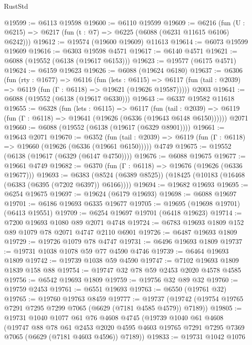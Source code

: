 \begin{lexlean}{RustStd}
\begin{coremodule}
@19599 := @6113 @19598
@19600 := @6110 @19599
@19609 := @6216
    (fun (U : @6215) => @6217 (fun (t : @7) => @6225 (@6088 (@6231 @11615 @6106) @6242)))
@19612 := @19574 (@19600 @19609) @11613
@19614 := @6073 @19599 @19609
@19616 := @6303 @19598 @4571
@19617 := @6140 @4571
@19621 := @6088 (@19552 (@6138 (@19617 @6153)))
@19623 := @19577 (@6175 @4571)
@19624 := @6159 @19623
@19626 := @6088 (@19624 @6180)
@19637 := @6306
    (fun (rty : @1677) =>
    @6116
      (fun (lets : @6115) =>
      @6117 (fun (tail : @2039) => @6119 (fun (Γ : @6118) => @19621 (@19626 @19587)))))
    @2003
@19641 := @6088 (@19552 (@6138 (@19617 @6330)))
@19643 := @6337 @19582 @11618
@19655 := @6328
    (fun (lets : @6115) =>
    @6117
      (fun (tail : @2039) =>
      @6119 (fun (Γ : @6118) => @19641 (@19626 (@6336 (@19643 @6148 @6150))))))
    @2071
@19660 := @6088 (@19552 (@6138 (@19617 (@6329 @8901))))
@19661 := @19643 @2071
@19670 := @6352
    (fun (tail : @2039) => @6119 (fun (Γ : @6118) => @19660 (@19626 (@6336 (@19661 @6150)))))
    @4749
@19675 := @19552 (@6138 (@19617 (@6329 (@6147 @4750))))
@19676 := @6088 @19675
@19677 := @19661 @4749
@19682 := @6370 (fun (Γ : @6118) => @19676 (@19626 (@6336 @19677)))
@19693 := @6383 (@8524 (@6389 @8525)) (@18425 (@10183 (@16468 (@6383 (@6395 (@7202 @6397)) @6166))))
@19694 := @19682 @19693
@19695 := @6254 @19675
@19697 := @19624 (@6179 @19693)
@19698 := @6088 @19697
@19701 := @6186 @19693 @6335 @19677
@19705 := @19695 (@19698 @19701) (@6413 @19551)
@19709 := @6254 @19697 @19701 (@6418 @19623)
@19714 := @7200 @19693 @1080 @89 @2071 @4748
@19724 := @6783 @19693 @1809 @152 @89 @1079 @78 @2071 @4747 @2110 @6901
@19726 := @6487 @19693 @1809
@19729 := @19726 @1079 @78 @4747
@19731 := @6496 @19693 @1809
@19737 := @19731 @1038 @1078 @59 @77 @4590 @4746
@19739 := @6464 @19693 @1809
@19742 := @19739 @1038 @59 @4590
@19747 := @7102 @19693 @1809 @1839 @158 @88
@19754 := @19747 @32 @78 @59 @2453 @2020 @4578 @4585
@19756 := @6542 @19693 @1809
@19759 := @19756 @32 @89 @32
@19760 := @19759 @2453
@19761 := @6551 @19693
@19763 := @6550 (@19761 @32)
@19765 := @19760 @19763 @8459
@19777 := @19737 (@19742 (@19754 @19765 @7291 @7295 @7299 @7065 (@6629 (@7181 @4585 @4579)) @7189))
@19805 := @19731
    @1040
    @1077
    @61
    @76
    @4608
    @4745
    (@19739
      @1040
      @61
      @4608
      (@19747
        @88
        @78
        @61
        @2453
        @2020
        @4595
        @4603
        @19765
        @7291
        @7295
        @7369
        @7065
        (@6629 (@7181 @4603 @4596))
        @7189))
@19833 := @19731
    @1042
    @1076

\end{coremodule}
\end{lexlean}
